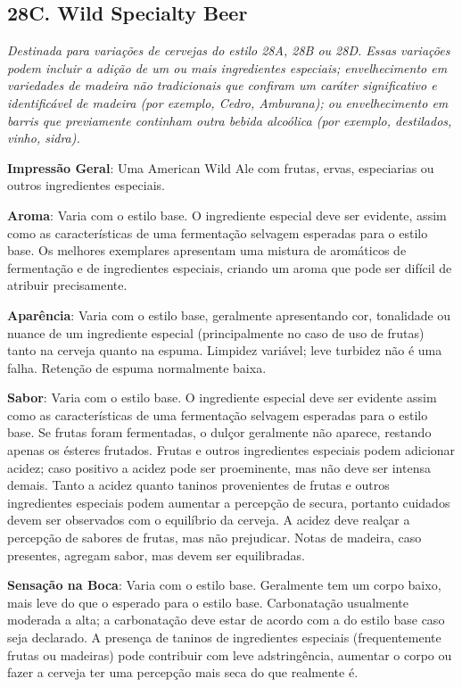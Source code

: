 \subsection*{28C. Wild Specialty Beer}
\textit{Destinada para variações de cervejas do estilo 28A, 28B ou 28D. Essas variações podem incluir a adição de um ou mais ingredientes especiais; envelhecimento em variedades de madeira não tradicionais que confiram um caráter significativo e identificável de madeira (por exemplo, Cedro, Amburana); ou envelhecimento em barris que previamente continham outra bebida alcoólica (por exemplo, destilados, vinho, sidra).}

\textbf{Impressão Geral}: Uma American Wild Ale com frutas, ervas, especiarias ou outros ingredientes especiais.

\textbf{Aroma}: Varia com o estilo base. O ingrediente especial deve ser evidente, assim como as características de uma fermentação selvagem esperadas para o estilo base. Os melhores exemplares apresentam uma mistura de aromáticos de fermentação e de ingredientes especiais, criando um aroma que pode ser difícil de atribuir precisamente.

\textbf{Aparência}: Varia com o estilo base, geralmente apresentando cor, tonalidade ou nuance de um ingrediente especial (principalmente no caso de uso de frutas) tanto na cerveja quanto na espuma. Limpidez variável; leve turbidez não é uma falha. Retenção de espuma normalmente baixa.

\textbf{Sabor}: Varia com o estilo base. O ingrediente especial deve ser evidente assim como as características de uma fermentação selvagem esperadas para o estilo base. Se frutas foram fermentadas, o dulçor geralmente não aparece, restando apenas os ésteres frutados. Frutas e outros ingredientes especiais podem adicionar acidez; caso positivo a acidez pode ser proeminente, mas não deve ser intensa demais. Tanto a acidez quanto taninos provenientes de frutas e outros ingredientes especiais podem aumentar a percepção de secura, portanto cuidados devem ser observados com o equilíbrio da cerveja. A acidez deve realçar a percepção de sabores de frutas, mas não prejudicar. Notas de madeira, caso presentes, agregam sabor, mas devem ser equilibradas.

\textbf{Sensação na Boca}: Varia com o estilo base. Geralmente tem um corpo baixo, mais leve do que o esperado para o estilo base. Carbonatação usualmente moderada a alta; a carbonatação deve estar de acordo com a do estilo base caso seja declarado. A presença de taninos de ingredientes especiais (frequentemente frutas ou madeiras) pode contribuir com leve adstringência, aumentar o corpo ou fazer a cerveja ter uma percepção mais seca do que realmente é.

